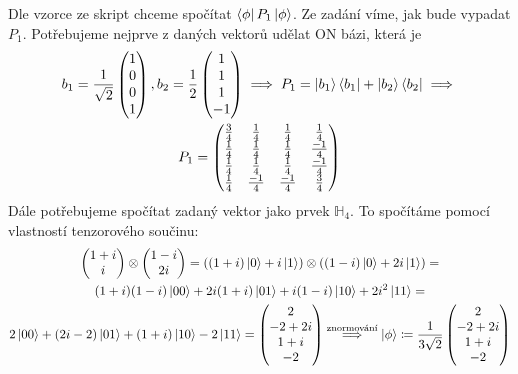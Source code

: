 \documentclass[12pt, a4paper]{article}
\begin{document}
\section{}
Dle vzorce ze skript chceme spočítat $\bra{\phi} P_1 \ket{\phi}$. Ze zadání víme, jak bude vypadat $P_1$. Potřebujeme nejprve z daných vektorů udělat ON bázi, která je 
\begin{gather*}
b_1 = \frac{1}{\sqrt{2}}\begin{pmatrix}
1 \\
0 \\
0 \\
1
\end{pmatrix},
b_2 = \frac{1}{2} \begin{pmatrix}
1 \\
1 \\
1 \\
-1
\end{pmatrix} \implies P_1 = \ket{b_1}\bra{b_1} + \ket{b_2}\bra{b_2} \implies\\
P_1 = \begin{pmatrix}
\frac{3}{4} & \frac{1}{4} & \frac{1}{4} & \frac{1}{4} \\
\frac{1}{4} & \frac{1}{4} & \frac{1}{4} & \frac{-1}{4} \\
\frac{1}{4} & \frac{1}{4} & \frac{1}{4} & \frac{-1}{4} \\
\frac{1}{4} & \frac{-1}{4} & \frac{-1}{4} & \frac{3}{4}
\end{pmatrix}
\end{gather*}
Dále potřebujeme spočítat zadaný vektor jako prvek $\mathbb{H}_4$. To spočítáme pomocí vlastností tenzorového součinu:
\begin{gather*}
\begin{pmatrix}
1+i\\
i
\end{pmatrix} \otimes
\begin{pmatrix}
1-i\\
2i
\end{pmatrix} = ((1+i)\ket{0} + i\ket{1}) \otimes ((1-i)\ket{0} + 2i\ket{1}) = \\
(1+i)(1-i)\ket{00} + 2i(1+i)\ket{01} + i(1-i)\ket{10} + 2i^2\ket{11} = \\
2\ket{00} + (2i-2)\ket{01} + (1+i)\ket{10} - 2\ket{11} = 
\begin{pmatrix}
2\\
-2+2i\\
1+i\\
-2
\end{pmatrix} \stackrel{\text{znormování}}{\implies} \ket{\phi} \coloneqq \frac{1}{3\sqrt{2}}\begin{pmatrix}
2\\
-2+2i\\
1+i\\
-2
\end{pmatrix}
\end{gather*}
\end{document}
